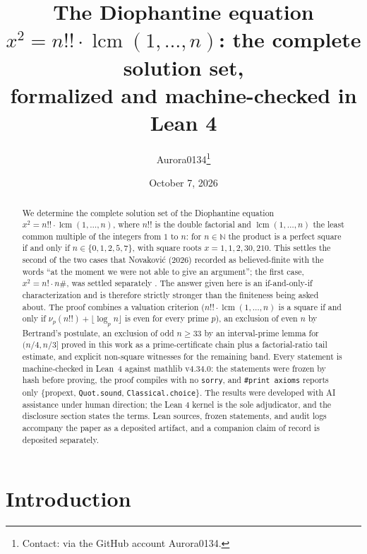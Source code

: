 \documentclass[11pt]{article}
\title{The Diophantine equation $x^2 = n!! \cdot \operatorname{lcm}(1,\dots,n)$: the complete solution set,\\ formalized and machine-checked in Lean 4}
\author{Aurora0134\thanks{Contact: via the GitHub account Aurora0134.}}
\date{October 7, 2026}
\theoremstyle{definition}
\begin{document}
\maketitle

\begin{abstract}
We determine the complete solution set of the Diophantine equation
$x^2 = n!! \cdot \operatorname{lcm}(1,\dots,n)$, where $n!!$ is the double
factorial and $\operatorname{lcm}(1,\dots,n)$ the least common multiple of the
integers from $1$ to $n$: for $n \in \mathbb{N}$ the product is a perfect
square if and only if $n \in \{0,1,2,5,7\}$, with square roots
$x = 1, 1, 2, 30, 210$. This settles the second of the two cases that
Novakovi\'c (2026) recorded as believed-finite with the words ``at the moment
we were not able to give an argument''; the first case, $x^2 = n! \cdot n\#$,
was settled separately \cite{nfactpaper}. The answer given here is an
if-and-only-if characterization and is therefore strictly stronger than the
finiteness being asked about. The proof combines a valuation criterion
($n!! \cdot \operatorname{lcm}(1,\dots,n)$ is a square if and only if
$\nu_p(n!!) + \lfloor \log_p n \rfloor$ is even for every prime $p$), an
exclusion of even $n$ by Bertrand's postulate, an exclusion of odd
$n \ge 33$ by an interval-prime lemma for $(n/4, n/3]$ proved in this work as
a prime-certificate chain plus a factorial-ratio tail estimate, and explicit
non-square witnesses for the remaining band. Every statement is
machine-checked in Lean~4 against mathlib v4.34.0: the statements were frozen
by hash before proving, the proof compiles with no \texttt{sorry}, and
\texttt{\#print axioms} reports only \{propext, \texttt{Quot.sound},
\texttt{Classical.choice}\}. The results were developed with AI assistance
under human direction; the Lean 4 kernel is the sole adjudicator, and the
disclosure section states the terms. Lean
sources, frozen statements, and audit logs accompany the paper as a deposited
artifact, and a companion claim of record is deposited separately.
\end{abstract}

\section{Introduction}\label{sec:intro}
\end{document}
